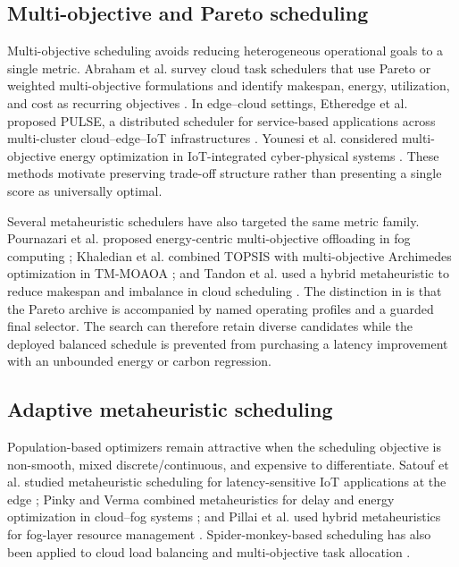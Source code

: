 \subsection{Multi-objective and Pareto scheduling}

Multi-objective scheduling avoids reducing heterogeneous operational goals to a single metric. Abraham et al. survey cloud task schedulers that use Pareto or weighted multi-objective formulations and identify makespan, energy, utilization, and cost as recurring objectives \cite{abraham2025multi}. In edge--cloud settings, Etheredge et al. proposed PULSE, a distributed scheduler for service-based applications across multi-cluster cloud--edge--IoT infrastructures \cite{Etheredge2026Pulse}. Younesi et al. considered multi-objective energy optimization in IoT-integrated cyber-physical systems \cite{younesi2025moticps}. These methods motivate preserving trade-off structure rather than presenting a single score as universally optimal.

Several metaheuristic schedulers have also targeted the same metric family. Pournazari et al. proposed energy-centric multi-objective offloading in fog computing \cite{pournazari2025multi}; Khaledian et al. combined TOPSIS with multi-objective Archimedes optimization in TM-MOAOA \cite{khaledian2025tm}; and Tandon et al. used a hybrid metaheuristic to reduce makespan and imbalance in cloud scheduling \cite{tandon2025novel}. The distinction in \method is that the Pareto archive is accompanied by named operating profiles and a guarded final selector. The search can therefore retain diverse candidates while the deployed balanced schedule is prevented from purchasing a latency improvement with an unbounded energy or carbon regression.

\subsection{Adaptive metaheuristic scheduling}

Population-based optimizers remain attractive when the scheduling objective is non-smooth, mixed discrete/continuous, and expensive to differentiate. Satouf et al. studied metaheuristic scheduling for latency-sensitive IoT applications at the edge \cite{satouf2025metaheuristic}; Pinky and Verma combined metaheuristics for delay and energy optimization in cloud--fog systems \cite{pinky2025enhanced}; and Pillai et al. used hybrid metaheuristics for fog-layer resource management \cite{sanjaikanth2025optimizing}. Spider-monkey-based scheduling has also been applied to cloud load balancing and multi-objective task allocation \cite{verma2024load,amer2024efficient,khaleel2025application}.

